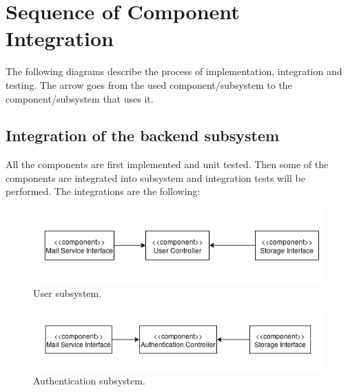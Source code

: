 \documentclass{report}
\begin{document}
\section{Sequence of Component Integration}
The following diagrams describe the process of implementation, integration
and testing. The arrow goes from the used component/subsystem to the
component/subsystem that uses it.
\subsection{Integration of the backend subsystem}
All the components are first implemented and unit tested. Then some of the components are integrated into subsystem and integration tests will be performed. The integrations are the following:
\begin{figure}[!ht]
	\begin{center}
	\includegraphics[width=\textwidth]{img/UserSub.png}
    \end{center}
    \label{fig:UserSub}
	\caption{User subsystem.}
\end{figure}
\begin{figure}[!ht]
	\begin{center}
	\includegraphics[width=\textwidth]{img/AuthSub.png}
    \end{center}
    \label{fig:AuthSub}
	\caption{Authentication subsystem.}
\end{figure}
\end{document}
